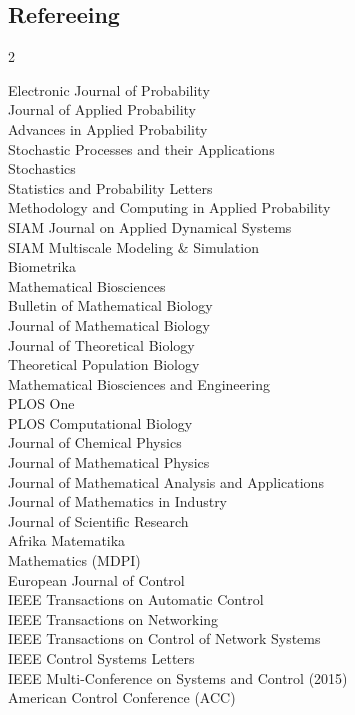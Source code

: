 \documentclass[11pt,a4paper]{article}
\begin{document}
\subsection{Refereeing}
{\small
\begin{multicols}{2}
\raggedright
Electronic Journal of Probability\\
Journal of Applied Probability\\
Advances in Applied Probability\\
Stochastic Processes and their Applications\\
Stochastics\\
Statistics and Probability Letters\\
Methodology and Computing in Applied Probability\\
SIAM Journal on Applied Dynamical Systems\\
SIAM Multiscale Modeling \& Simulation\\
Biometrika\\
Mathematical Biosciences\\
Bulletin of Mathematical Biology\\
Journal of Mathematical Biology\\
Journal of Theoretical Biology\\
Theoretical Population Biology\\
Mathematical Biosciences and Engineering\\
PLOS One\\
PLOS Computational Biology\\
Journal of Chemical Physics\\
Journal of Mathematical Physics\\
Journal of Mathematical Analysis and Applications\\
Journal of Mathematics in Industry\\
Journal of Scientific Research\\
Afrika Matematika\\
Mathematics (MDPI)\\
European Journal of Control\\
IEEE Transactions on Automatic Control\\
IEEE Transactions on Networking\\
IEEE Transactions on Control of Network Systems\\
IEEE Control Systems Letters\\
IEEE Multi-Conference on Systems and Control (2015)\\
American Control Conference (ACC)
\end{multicols}}
\end{document}
